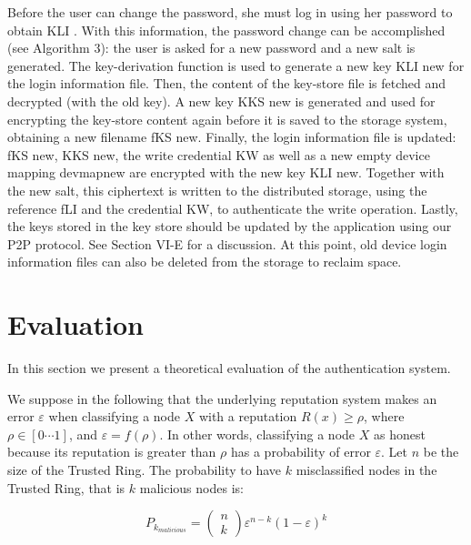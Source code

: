 Before the user can change the password, she must log in using her password to
obtain KLI . With this information, the password change can be accomplished
(see Algorithm 3): the user is asked for a new password and a new salt is
generated. The key-derivation function is used to generate a new key KLI new
for the login information file. Then, the content of the key-store file is
fetched and decrypted (with the old key). A new key KKS new is generated and
used for encrypting the key-store content again before it is saved to the
storage system, obtaining a new filename fKS new.
Finally, the login information file
is updated: fKS new, KKS new, the write credential KW as well as a new empty
device mapping devmapnew are encrypted with the new key KLI new.
  Together with the new salt, this ciphertext is written to the distributed
storage, using the reference fLI and the credential KW, to authenticate the
write operation. Lastly, the keys stored in the key store should be updated by
the application using our P2P protocol.  See Section VI-E for a discussion. At
this point, old device login information files can also be deleted from the
storage to reclaim space.


\chapter{Evaluation}

In this section we present a theoretical evaluation of
the authentication system.


We suppose in the following that the underlying
reputation system makes an error $\varepsilon$ when classifying a
node $X$ with a reputation $R(x) \geq \rho$, where $\rho \in [ 0 \cdots 1 ]$,
and $ \varepsilon = f ( \rho )$. In other words, classifying a node $X$ as
honest because its reputation is greater than $\rho$ has a
probability of error $\varepsilon$.
Let $n$ be the size of the Trusted Ring. The probability
to have $k$ misclassified nodes in the Trusted Ring, that
is $k$ malicious nodes is:

$$
P_{k_{malicious}} = \left(\!
                          \begin{array}{c}
                            n\\
                            k
                          \end{array}
                    \!\right)              
                    \varepsilon^{n-k} ( 1 - \varepsilon )^k
$$

